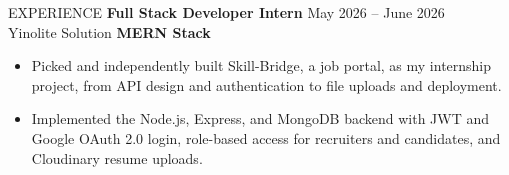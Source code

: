 \documentclass{resume}
\begin{document}
\begin{rSection}{EXPERIENCE}
\vspace{-2pt}
\textbf{Full Stack Developer Intern} \hfill {May 2026 -- June 2026}\\
Yinolite Solution \hfill {\small \textbf{MERN Stack}}
\begin{itemize}[leftmargin=*, itemsep=-3pt, topsep=0pt]
\item Picked and independently built Skill-Bridge, a job portal, as my internship project, from API design and
authentication to file uploads and deployment.
\item Implemented the Node.js, Express, and MongoDB backend with JWT and Google OAuth 2.0 login, role-based access
for recruiters and candidates, and Cloudinary resume uploads.
\end{itemize}
\vspace{-4pt}
\end{rSection}
\end{document}
